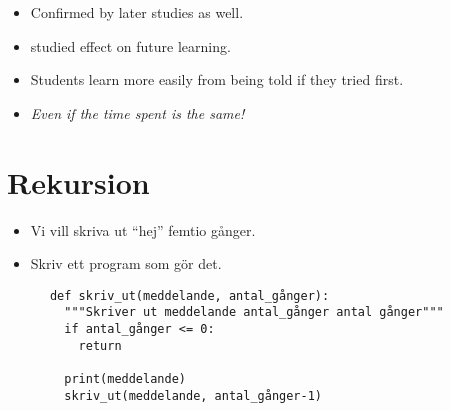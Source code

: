 \begin{frame}
  \begin{remark}[Reproduced]
    \begin{itemize}
      \item Confirmed by later studies as well.
      \item \Textcite{BransfordSchwartz1999} studied effect on future learning.
      \item Students learn more easily from being told if they tried first.
    \end{itemize}
  \end{remark}

  \pause

  \begin{remark}
    \begin{itemize}
      \item \emph{Even if the time spent is the same!}
    \end{itemize}
  \end{remark}
\end{frame}


\section{Rekursion}

\begin{frame}
  \begin{exercise}
    \begin{itemize}
      \item Vi vill skriva ut \enquote{hej} femtio gånger.
      \item Skriv ett program som gör det.
    \end{itemize}
  \end{exercise}
\end{frame}

\begin{frame}[fragile]
  \begin{solution}
    \begin{verbatim}
      def skriv_ut(meddelande, antal_gånger):
        """Skriver ut meddelande antal_gånger antal gånger"""
        if antal_gånger <= 0:
          return

        print(meddelande)
        skriv_ut(meddelande, antal_gånger-1)
    \end{verbatim}
  \end{solution}
\end{frame}

